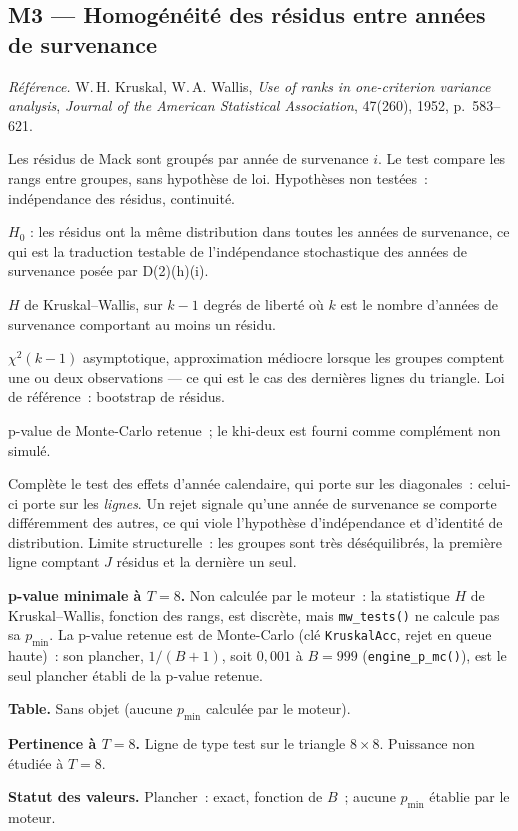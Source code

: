 \documentclass[a4paper,11pt]{article}
\newcommand{\code}[1]{\texttt{\small #1}}
\newcommand{\refl}[1]{{\small\textcolor{maincolor!70!black}{\textit{Référence.} #1}}\par\smallskip}
\newcounter{ficheid}
\newenvironment{fiche}[1]{%
  \stepcounter{ficheid}%
  \phantomsection
  \subsection{#1}%
  \label{fiche:\theficheid}%
}{%
  \end{description}\vspace{0.5em}%
}
\newcommand{\Cadre}{%
  \begin{description}[leftmargin=0pt, style=unboxed, itemsep=3pt, topsep=3pt, parsep=2pt]%
  \item[\textcolor{financeblue}{\textbf{1. Cadre, notations et hypothèses de validité (non testées).}}]}
\newcommand{\Hzero}{\item[\textcolor{financeblue}{\textbf{2. Hypothèse nulle.}}]}
\newcommand{\Stat}{\item[\textcolor{financeblue}{\textbf{3. Statistique de test.}}]}
\newcommand{\Loi}{\item[\textcolor{financeblue}{\textbf{4. Loi sous $H_0$.}}]}
\newcommand{\Pval}{\item[\textcolor{financeblue}{\textbf{5. p-value.}}]}
\newcommand{\Usage}{\item[\textcolor{financeblue}{\textbf{6. Usage et limites.}}]}
\newcommand{\Pertinence}{\item[\textcolor{financeblue}{\textbf{7. Pertinence et puissance à faible $T$.}}]}
\begin{document}
\begin{fiche}{M3 --- Homogénéité des résidus entre années de survenance}
\label{mw:m3acc}
\refl{W.\,H. Kruskal, W.\,A. Wallis, \emph{Use of ranks in one-criterion variance
analysis}, \emph{Journal of the American Statistical Association}, 47(260),
1952, p.~583--621.}
\Cadre
Les résidus de Mack sont groupés par année de survenance $i$. Le test compare
les rangs entre groupes, sans hypothèse de loi. Hypothèses non testées~:
indépendance des résidus, continuité.
\Hzero
$H_0$ : les résidus ont la même distribution dans toutes les années de
survenance, ce qui est la traduction testable de l'indépendance stochastique des
années de survenance posée par D(2)(h)(i).
\Stat
$H$ de Kruskal--Wallis, sur $k-1$ degrés de liberté où $k$ est le nombre
d'années de survenance comportant au moins un résidu.
\Loi
$\chi^2(k-1)$ asymptotique, approximation médiocre lorsque les groupes comptent
une ou deux observations --- ce qui est le cas des dernières lignes du triangle.
Loi de référence~: bootstrap de résidus.
\Pval
p-value de Monte-Carlo retenue~; le khi-deux est fourni comme complément non
simulé.
\Usage
Complète le test des effets d'année calendaire, qui porte sur les diagonales~:
celui-ci porte sur les \emph{lignes}. Un rejet signale qu'une année de
survenance se comporte différemment des autres, ce qui viole l'hypothèse
d'indépendance et d'identité de distribution. Limite structurelle~: les groupes
sont très déséquilibrés, la première ligne comptant $J$ résidus et la dernière
un seul.
\Pertinence
\textbf{p-value minimale à $T = 8$.} Non calculée par le moteur~: la statistique $H$ de Kruskal--Wallis, fonction des rangs, est discrète, mais \code{mw\_tests()} ne calcule pas sa $p_{\min}$. La p-value retenue est de Monte-Carlo (clé \code{KruskalAcc}, rejet en queue haute)~: son plancher, $1/(B+1)$, soit $0{,}001$ à $B = 999$ (\code{engine\_p\_mc()}), est le seul plancher établi de la p-value retenue.

\textbf{Table.} Sans objet (aucune $p_{\min}$ calculée par le moteur).

\textbf{Pertinence à $T = 8$.} Ligne de type test sur le triangle $8\times 8$. Puissance non étudiée à $T = 8$.

\textbf{Statut des valeurs.} Plancher~: exact, fonction de $B$~; aucune $p_{\min}$ établie par le moteur.
\end{fiche}
\end{document}
